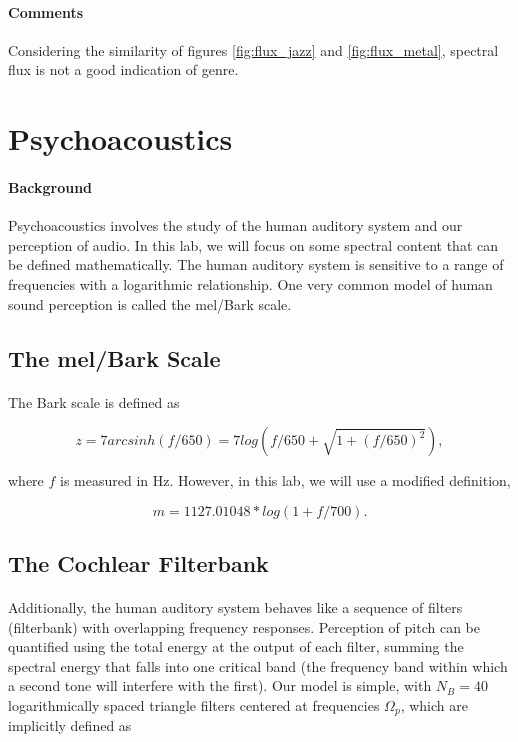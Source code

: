 \documentclass[11pt,a4paper]{article}
\begin{document}
\paragraph{Comments} Considering the similarity of figures \ref{fig:flux_jazz} and \ref{fig:flux_metal}, spectral flux is not a good indication of genre. 

\section{Psychoacoustics}
\paragraph{Background} Psychoacoustics involves the study of the human auditory system and our perception of audio. In this lab, we will focus on some spectral content that can be defined mathematically. The human auditory system is sensitive to a range of frequencies with a logarithmic relationship. One very common model of human sound perception is called the mel/Bark scale.

\subsection{The mel/Bark Scale}
\paragraph*{} The Bark scale is defined as

\begin{equation*}
z = 7arcsinh(f/650)=7log\left(f/650+\sqrt{1+(f/650)^2}\right),
\end{equation*}

where $f$ is measured in Hz. However, in this lab, we will use a modified definition,

\begin{equation}
m = 1127.01048*log(1+f/700).
\end{equation}

\subsection{The Cochlear Filterbank}
\paragraph*{} Additionally, the human auditory system behaves like a sequence of filters (filterbank) with overlapping frequency responses.
Perception of pitch can be quantified using the total energy at the output of each filter, summing the spectral energy that falls into one critical band (the frequency band within which a second tone will interfere with the first). Our model is simple, with $N_B=40$ logarithmically spaced triangle filters centered at frequencies $\Omega_p$, which are implicitly defined as
\end{document}

